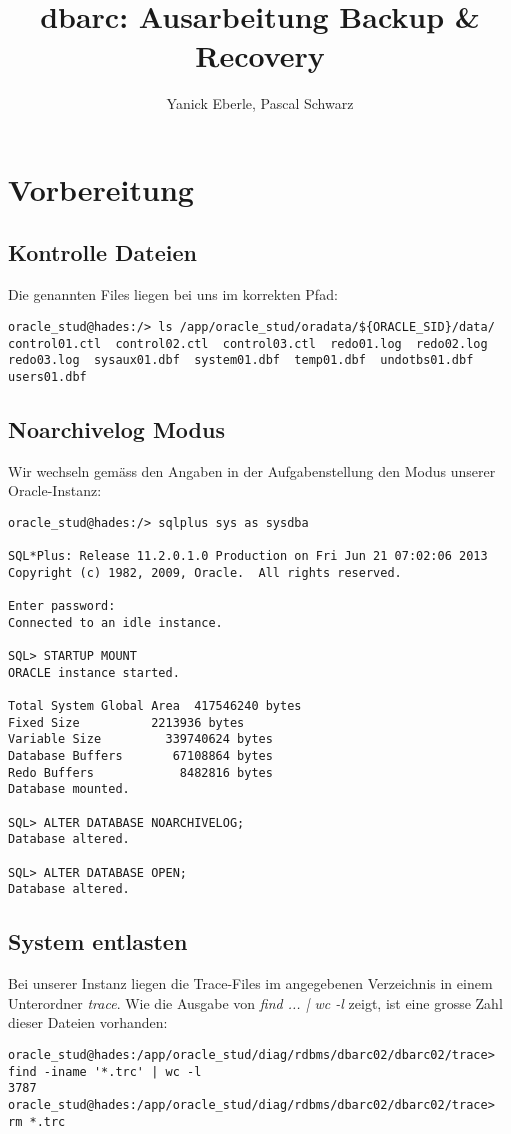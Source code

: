 \documentclass[11pt,a4paper,parskip=half]{scrartcl}
\title{dbarc: Ausarbeitung Backup \& Recovery}
\author{Yanick Eberle, Pascal Schwarz}
\begin{document}
\maketitle
\newpage
\tableofcontents

\pagestyle{fancy}

\newpage
\section{Vorbereitung}
\subsection{Kontrolle Dateien}
Die genannten Files liegen bei uns im korrekten Pfad:
\begin{lstlisting}
oracle_stud@hades:/> ls /app/oracle_stud/oradata/${ORACLE_SID}/data/
control01.ctl  control02.ctl  control03.ctl  redo01.log  redo02.log  redo03.log  sysaux01.dbf  system01.dbf  temp01.dbf  undotbs01.dbf  users01.dbf
\end{lstlisting}

\subsection{Noarchivelog Modus}
Wir wechseln gemäss den Angaben in der Aufgabenstellung den Modus unserer Oracle-Instanz:
\begin{lstlisting}
oracle_stud@hades:/> sqlplus sys as sysdba

SQL*Plus: Release 11.2.0.1.0 Production on Fri Jun 21 07:02:06 2013
Copyright (c) 1982, 2009, Oracle.  All rights reserved.

Enter password: 
Connected to an idle instance.

SQL> STARTUP MOUNT
ORACLE instance started.

Total System Global Area  417546240 bytes
Fixed Size		    2213936 bytes
Variable Size		  339740624 bytes
Database Buffers	   67108864 bytes
Redo Buffers		    8482816 bytes
Database mounted.

SQL> ALTER DATABASE NOARCHIVELOG;
Database altered.

SQL> ALTER DATABASE OPEN;
Database altered.
\end{lstlisting}

\subsection{System entlasten}
Bei unserer Instanz liegen die Trace-Files im angegebenen Verzeichnis in einem Unterordner \emph{trace}. Wie die Ausgabe von \emph{find ... | wc -l} zeigt, ist eine grosse Zahl dieser Dateien vorhanden:
\begin{lstlisting}
oracle_stud@hades:/app/oracle_stud/diag/rdbms/dbarc02/dbarc02/trace> find -iname '*.trc' | wc -l
3787
oracle_stud@hades:/app/oracle_stud/diag/rdbms/dbarc02/dbarc02/trace> rm *.trc

\end{lstlisting}
\end{document}
